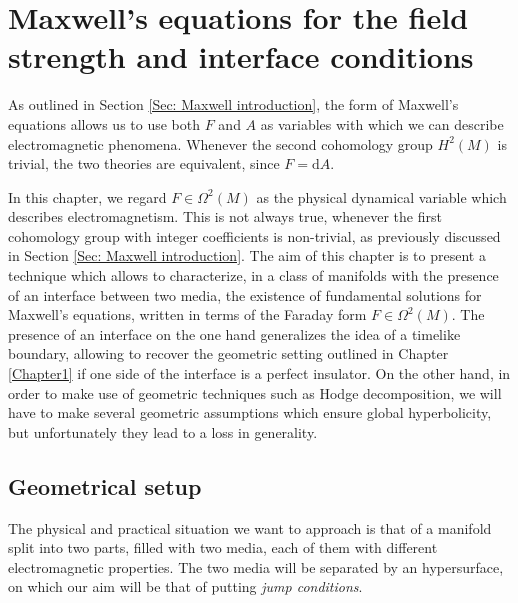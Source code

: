 \chapter{Maxwell's equations for the field strength and interface conditions} %

\label{Chapter2} %




As outlined in Section \ref{Sec: Maxwell introduction}, the form of Maxwell's equations allows us to use both $F$ and $A$ as variables with which we can describe electromagnetic phenomena. Whenever the second cohomology group $H^2(M)$ is trivial, the two theories are equivalent, since $F=\mathrm{d}A$.


In this chapter, we regard $F\in\Omega^2(M)$ as the physical dynamical variable which describes electromagnetism. This is not always true, whenever the first cohomology group with integer coefficients is non-trivial, as previously discussed in Section \ref{Sec: Maxwell introduction}. The aim of this chapter is to present a technique which allows to characterize, in a class of manifolds with the presence of an interface between two media, the existence of fundamental solutions for Maxwell's equations, written in terms of the Faraday form $F\in\Omega^2(M)$. The presence of an interface on the one hand generalizes the idea of a timelike boundary, allowing to recover the geometric setting outlined in Chapter \ref{Chapter1} if one side of the interface is a perfect insulator. On the other hand, in order to make use of geometric techniques such as Hodge decomposition, we will have to make several geometric assumptions which ensure global hyperbolicity, but unfortunately they lead to a loss in generality.

\section{Geometrical setup}\label{Sec: static decomposition}
The physical and practical situation we want to approach is that of a manifold split into two parts, filled with two media, each of them with different electromagnetic properties. The two media will be separated by an hypersurface, on which our aim will be that of putting \emph{jump conditions}.

